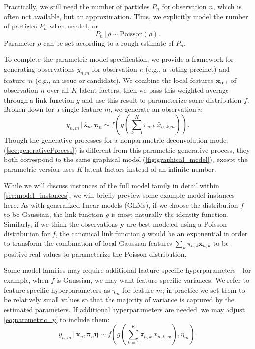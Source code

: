 \documentclass[twoside,11pt]{article}
\newcommand{\g}{\, | \,}
\begin{document}
Practically, we still need the number of particles $P_n$ for observation $n$, which is often not available, but an approximation.  Thus, we explicitly model the number of particles $P_n$ when needed, or
\begin{equation}
P_n \g \rho \sim \mbox{Poisson}(\rho).
\label{eq:parametric_p}
\end{equation}
Parameter $\rho$ can be set according to a rough estimate of $P_n$.

To complete the parametric model specification, we provide a framework for generating observations $y_{n,m}$ for observation $n$ (e.g., a voting precinct) and feature $m$ (e.g., an issue or candidate).  We combine the local features $\boldsymbol{\bar{x}_{n,k}}$ of observation $n$ over all $K$ latent factors, then we pass this weighted average through a link function $g$ and use this result to parameterize some distribution $f$.  Broken down for a single feature $m$, we generate an observation $n$
\begin{equation}
y_{n,m} \g \boldsymbol{\bar{x}}_{n}, \boldsymbol{\pi}_n \sim f\left(g\left(\sum_{k=1}^K \pi_{n,k}~ \bar{x}_{n,k,m}\right)\right). \label{eq:parametric_y}
\end{equation}
Though the generative processes for a nonparametric deconvolution model (\cref{sec:generativeProcess}) is different from this parametric generative process, they both correspond to the same graphical model (\cref{fig:graphical_model}), except the parametric version uses $K$ latent factors instead of an infinite number.

While we will discuss instances of the full model family in detail within \cref{sec:model_instances}, we will briefly preview some example model instances here.  As with generalized linear models (GLMs), if we choose the distribution $f$ to be Gaussian, the link function $g$ is most naturally the identity function.  Similarly, if we think the observations $\boldsymbol{y}$ are best modeled using a Poisson distribution for $f$, the canonical link function $g$ would be an exponential in order to transform the combination of local Gaussian features $\sum_k \pi_{n,k} \boldsymbol{\bar{x}}_{n,k}$ to be positive real values to parameterize the Poisson distribution.

Some model families may require additional feature-specific hyperparameters---for example, when $f$ is Gaussian, we may want feature-specific variances.  We refer to feature-specific hyperparameters as $\eta_m$ for feature $m$; in practice we set them to be relatively small values so that the majority of variance is captured by the estimated parameters.
If additional hyperparameters are needed, we may adjust \cref{eq:parametric_y} to include them:
\begin{equation}
y_{n,m} \g \boldsymbol{\bar{x}}_{n}, \boldsymbol{\pi}_n \boldsymbol{\eta} \sim f\left(g\left(\sum_{k=1}^K \pi_{n,k}~ \bar{x}_{n,k,m} \right), \eta_m\right). \label{eq:parametric_y_with_eta}
\end{equation}
\end{document}
